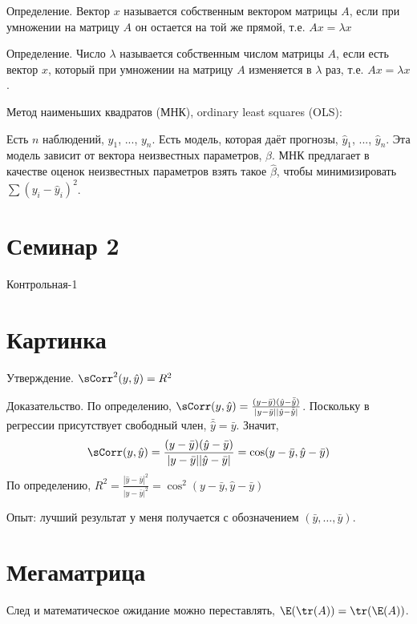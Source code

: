 \documentclass[pdftex,12pt,a4paper]{article}
\def \hb{\hat{\beta}}
\def \hy{\hat{y}}
\begin{document}
Определение. Вектор $x$ называется собственным вектором матрицы $A$, если при умножении на матрицу $A$ он остается на той же прямой, т.е. $Ax=\lambda x$


Определение. Число $\lambda$ называется собственным числом матрицы $A$, если есть вектор $x$, который при умножении на матрицу $A$ изменяется в $\lambda$ раз, т.е. $Ax=\lambda x$.




Метод наименьших квадратов (МНК), ordinary least squares (OLS):


Есть $n$ наблюдений, $y_1$, ..., $y_n$. Есть модель, которая даёт прогнозы, $\hat{y}_1$, ..., $\hat{y}_n$. Эта модель зависит от вектора неизвестных параметров, $\beta$. МНК предлагает в качестве оценок неизвестных параметров взять такое $\hb$, чтобы минимизировать $\sum (y_i-\hat{y}_i)^2$.

\section{Семинар 2}

Контрольная-1

\section{Картинка}


Утверждение. $\sCorr^2(y,\hy)=R^2$

Доказательство. По определению, $\sCorr(y,\hy)=\frac{(y-\bar{y})(\hy-\bar{\hy})}{|y-\bar{y}||\hy-\bar{\hy}|}$. Поскольку в регрессии присутствует свободный член, $\bar{\hy}=\bar{y}$. Значит, 
\begin{equation}
\sCorr(y,\hy)=\frac{(y-\bar{y})(\hy-\bar{y})}{|y-\bar{y}||\hy-\bar{y}|}=\cos(y-\bar{y},\hy-\bar{y})
\end{equation}
По определению, $R^2=\frac{|\hy-\bar{y}|^2}{|y-\bar{y}|^2}=\cos^2(y-\bar{y},\hy-\bar{y})$



Опыт: лучший результат у меня получается с обозначением $(\bar{y},\ldots,\bar{y})$.


\section{Мегаматрица}
 
\begin{theorem}
След и математическое ожидание можно переставлять, $\E(\tr(A))=\tr(\E(A))$.
\end{theorem} 
\end{document}
